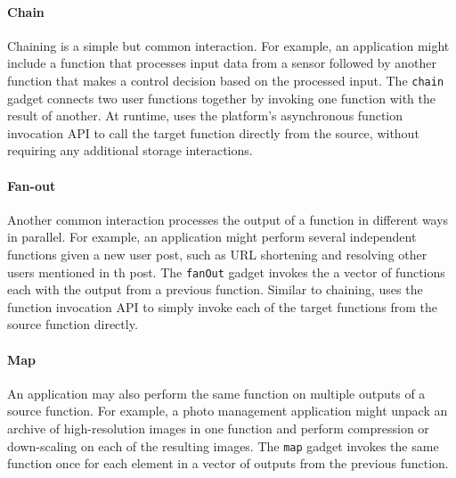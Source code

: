 \paragraph{Chain}
Chaining is a simple but common interaction. For example, an application might
include a function that processes input data from a sensor followed by another
function that makes a control decision based on the processed input. The
\texttt{chain} gadget connects two user functions together by invoking one
function with the result of another. At runtime, \name{} uses the platform's
asynchronous function invocation API to call the target function directly from
the source, without requiring any additional storage interactions.


\paragraph{Fan-out}
Another common interaction processes the output of a function in different ways
in parallel. For example, an application might perform several independent
functions given a new user post, such as URL shortening and resolving other
users mentioned in th post. The \texttt{fanOut} gadget invokes the a vector of
functions each with the output from a previous function. Similar to chaining,
\name{} uses the function invocation API to simply invoke each of the target
functions from the source function directly. 

\paragraph{Map}
An application may also perform the same function on multiple outputs of a
source function. For example, a photo management application might unpack an
archive of high-resolution images in one function and perform compression or
down-scaling on each of the resulting images. The \texttt{map} gadget invokes
the same function once for each element in a vector of outputs from the
previous function. 


